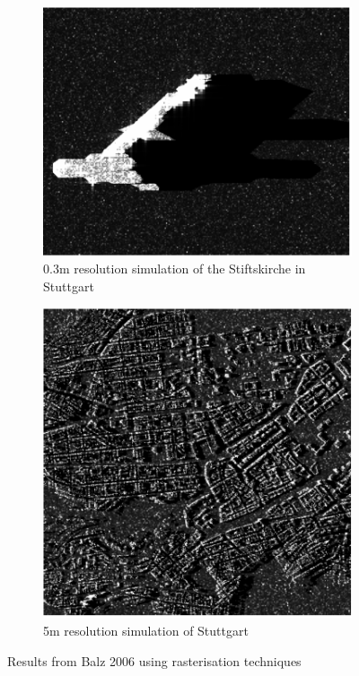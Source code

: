 \begin{figure}
\centering
\begin{subfigure}{.5\textwidth}
	\centering
	\includegraphics[width=0.9\linewidth]{../figures/balz_2006_stiftskirche}
	\caption{0.3m resolution simulation of the Stiftskirche in Stuttgart}
	\label{fig:balz_2006_stiftskirche}
\end{subfigure}%
\begin{subfigure}{.5\textwidth}
	\centering
	\includegraphics[width=0.9\linewidth]{../figures/balz_2006_stuttgart}	
	\caption{5m resolution simulation of Stuttgart}
	\label{fig:balz_2006_stuttgart}
\end{subfigure}
\caption{Results from Balz 2006 \cite{balzImprovedRealTimeSAR2006} using rasterisation techniques}
\label{fig:balz_2006_images}
	
\end{figure}

